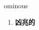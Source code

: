 
\begin{frame}
{\huge ominous}
\begin{center}
\begin{enumerate}\Large
  \item \textbf{凶兆的}
\end{enumerate}
\end{center}
\end{frame}
